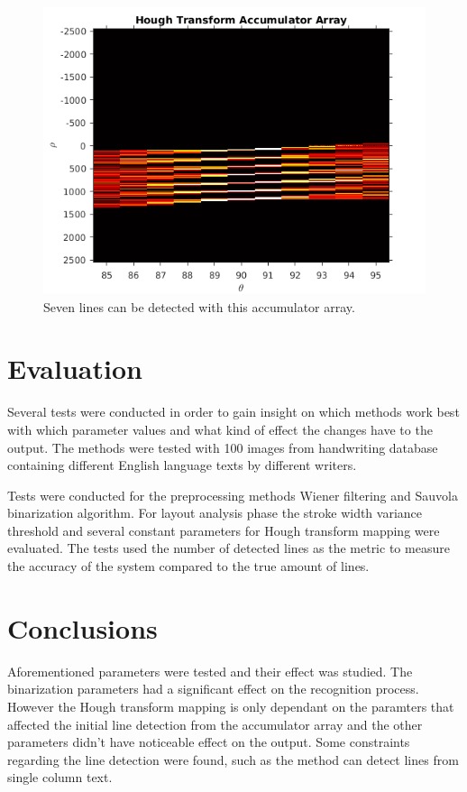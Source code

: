 \documentclass{article}
\begin{document}
\begin{multicols}{2}
        \begin{figure}[H]
          \centering
          \includegraphics[natwidth=560,natheight=420,scale=0.3]{hough_accArr_a01-000u.png}
          \caption{Seven lines can be detected with this accumulator array.\label{fig:houghacc2}}
        \end{figure}

        \section*{Evaluation}
          Several tests were conducted in order to gain insight on which methods work best with which parameter values and what kind of effect the changes have to the output. The methods were tested with 100 images from handwriting database containing different English language texts by different writers.

          Tests were conducted for the preprocessing methods Wiener filtering and Sauvola binarization algorithm. For layout analysis phase the stroke width variance threshold and several constant parameters for Hough transform mapping were evaluated. The tests used the number of detected lines as the metric to measure the accuracy of the system compared to the true amount of lines.

        \section*{Conclusions}
          Aforementioned parameters were tested and their effect was studied. The binarization parameters had a significant effect on the recognition process. However the Hough transform mapping is only dependant on the paramters that affected the initial line detection from the accumulator array and the other parameters didn't have noticeable effect on the output. Some constraints regarding the line detection were found, such as the method can detect lines from single column text.


\end{multicols}
\end{document}
